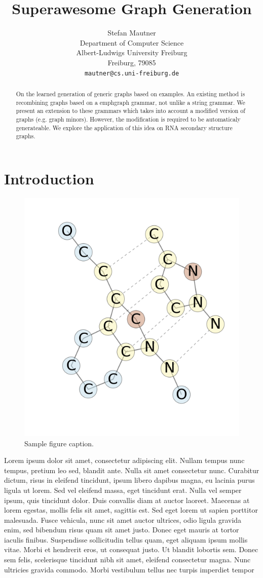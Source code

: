 \documentclass{article}
\title{Superawesome Graph Generation}
\author{
  Stefan Mautner\\
  Department of Computer Science\\
  Albert-Ludwigs University Freiburg\\
  Freiburg, 79085  \\
  \texttt{mautner@cs.uni-freiburg.de} \\
}
\begin{document}

\maketitle

\begin{abstract}
On the learned generation of generic graphs based on examples.
An existing method is recombining
graphs based on a emph{graph grammar}, not unlike a string grammar. 
We present an extension to these grammars which takes into account
a modified version of graphs (e.g. graph minors). However, the 
modification is required to be automaticaly generateable. 
We explore the application of this idea
on RNA secondary structure graphs. 




\end{abstract}
\section{Introduction}


% 
\begin{figure}[ht]
      \centering
        \includegraphics[width=0.2\linewidth]{images/cip.png}
      \caption{Sample figure caption.}
      \label{nazis}
\end{figure}

Lorem ipsum dolor sit amet, consectetur adipiscing elit. Nullam tempus nunc tempus, pretium leo sed, blandit ante. Nulla sit amet consectetur nunc. Curabitur dictum, risus in eleifend tincidunt, ipsum libero dapibus magna, eu lacinia purus ligula ut lorem. Sed vel eleifend massa, eget tincidunt erat. Nulla vel semper ipsum, quis tincidunt dolor. Duis convallis diam at auctor laoreet. Maecenas at lorem egestas, mollis felis sit amet, sagittis est. Sed eget lorem ut sapien porttitor malesuada. Fusce vehicula, nunc sit amet auctor ultrices, odio ligula gravida enim, sed bibendum risus quam sit amet justo. Donec eget mauris at tortor iaculis finibus. Suspendisse sollicitudin tellus quam, eget aliquam ipsum mollis vitae. Morbi et hendrerit eros, ut consequat justo. Ut blandit lobortis sem. Donec sem felis, scelerisque tincidunt nibh sit amet, eleifend consectetur magna. Nunc ultricies gravida commodo. Morbi vestibulum tellus nec turpis imperdiet tempor
\end{document}

